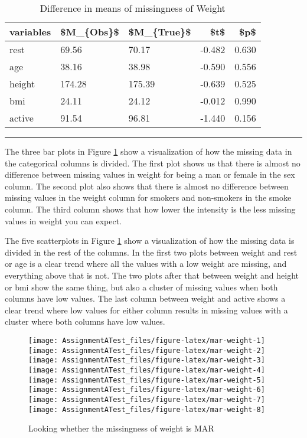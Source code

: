 \documentclass[
]{article}
\begin{document}
\begin{table}

\caption{\label{tab:missW}Difference in means of missingness of Weight}
\centering
\begin{tabular}[t]{l|l|l|r|r}
\hline
variables & \$M\_\{Obs\}\$ & \$M\_\{True\}\$ & \$t\$ & \$p\$\\
\hline
rest & 69.56 & 70.17 & -0.482 & 0.630\\
\hline
age & 38.16 & 38.98 & -0.590 & 0.556\\
\hline
height & 174.28 & 175.39 & -0.639 & 0.525\\
\hline
bmi & 24.11 & 24.12 & -0.012 & 0.990\\
\hline
active & 91.54 & 96.81 & -1.440 & 0.156\\
\hline
\end{tabular}
\end{table}

\begin{center}\rule{0.5\linewidth}{0.5pt}\end{center}

The three bar plots in Figure \ref{fig:mar-weight} show a visualization of how the missing data in the categorical columns is divided. The first plot shows us that there is almost no difference between missing values in weight for being a man or female in the sex column. The second plot also shows that there is almost no difference between missing values in the weight column for smokers and non-smokers in the smoke column. The third column shows that how lower the intensity is the less missing values in weight you can expect.

The five scatterplots in Figure \ref{fig:mar-weight} show a visualization of how the missing data is divided in the rest of the columns. In the first two plots between weight and rest or age is a clear trend where all the values with a low weight are missing, and everything above that is not. The two plots after that between weight and height or bmi show the same thing, but also a cluster of missing values when both columns have low values. The last column between weight and active shows a clear trend where low values for either column results in missing values with a cluster where both columns have low values.

\begin{figure}
\texttt{[image: AssignmentATest\_files/figure-latex/mar-weight-1]} \texttt{[image: AssignmentATest\_files/figure-latex/mar-weight-2]} \texttt{[image: AssignmentATest\_files/figure-latex/mar-weight-3]} \texttt{[image: AssignmentATest\_files/figure-latex/mar-weight-4]} \texttt{[image: AssignmentATest\_files/figure-latex/mar-weight-5]} \texttt{[image: AssignmentATest\_files/figure-latex/mar-weight-6]} \texttt{[image: AssignmentATest\_files/figure-latex/mar-weight-7]} \texttt{[image: AssignmentATest\_files/figure-latex/mar-weight-8]} \caption{Looking whether the missingness of weight is MAR}\label{fig:mar-weight}
\end{figure}
\end{document}
